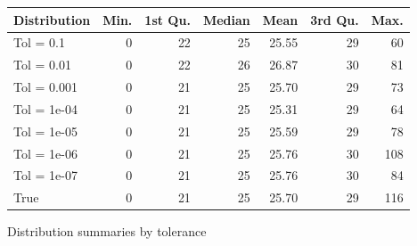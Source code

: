 \begin{figure}
\begin{center}
\begin{tabular}{lrrrrrr}
 Distribution & Min. & 1st Qu. & Median & Mean & 3rd Qu. & Max. \\ 
  \hline
\hline
Tol =  0.1 & 0 & 22 & 25 & 25.55 & 29 & 60 \\ 
  Tol =  0.01 & 0 & 22 & 26 & 26.87 & 30 & 81 \\ 
  Tol =  0.001 & 0 & 21 & 25 & 25.70 & 29 & 73 \\ 
  Tol =  1e-04 & 0 & 21 & 25 & 25.31 & 29 & 64 \\ 
  Tol =  1e-05 & 0 & 21 & 25 & 25.59 & 29 & 78 \\ 
  Tol =  1e-06 & 0 & 21 & 25 & 25.76 & 30 & 108 \\ 
  Tol =  1e-07 & 0 & 21 & 25 & 25.76 & 30 & 84 \\ 
  True & 0 & 21 & 25 & 25.70 & 29 & 116 \\ 
  \end{tabular}
\end{center}
  \caption{Distribution summaries by tolerance}
\label{tab:SummaryTable}
\end{figure} 

